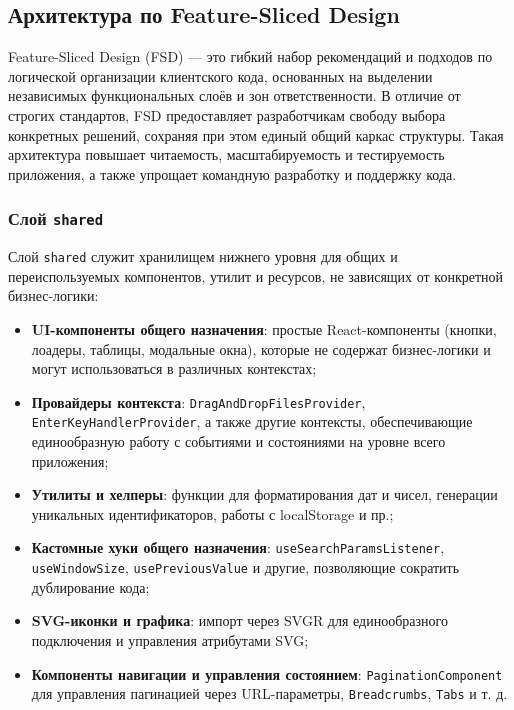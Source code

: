 \subsection{Архитектура по Feature-Sliced Design}

Feature-Sliced Design (FSD) — это гибкий набор рекомендаций и подходов по логической организации клиентского кода, основанных на выделении независимых функциональных слоёв и зон ответственности. В отличие от строгих стандартов, FSD предоставляет разработчикам свободу выбора конкретных решений, сохраняя при этом единый общий каркас структуры. Такая архитектура повышает читаемость, масштабируемость и тестируемость приложения, а также упрощает командную разработку и поддержку кода.

\subsubsection{Слой \texttt{shared}}

Слой \texttt{shared} служит хранилищем нижнего уровня для общих и переиспользуемых компонентов, утилит и ресурсов, не зависящих от конкретной бизнес-логики:

\begin{itemize}
	\item \textbf{UI-компоненты общего назначения}: простые React-компоненты (кнопки, лоадеры, таблицы, модальные окна), которые не содержат бизнес-логики и могут использоваться в различных контекстах;
	\item \textbf{Провайдеры контекста}: \texttt{DragAndDropFilesProvider}, \texttt{EnterKeyHandlerProvider}, а также другие контексты, обеспечивающие единообразную работу с событиями и состояниями на уровне всего приложения;
	\item \textbf{Утилиты и хелперы}: функции для форматирования дат и чисел, генерации уникальных идентификаторов, работы с localStorage и пр.;
	\item \textbf{Кастомные хуки общего назначения}: \texttt{useSearchParamsListener}, \texttt{useWindowSize}, \texttt{usePreviousValue} и другие, позволяющие сократить дублирование кода;
	\item \textbf{SVG-иконки и графика}: импорт через SVGR для единообразного подключения и управления атрибутами SVG;
	\item \textbf{Компоненты навигации и управления состоянием}: \texttt{PaginationComponent} для управления пагинацией через URL-параметры, \texttt{Breadcrumbs}, \texttt{Tabs} и т. д.
\end{itemize}


